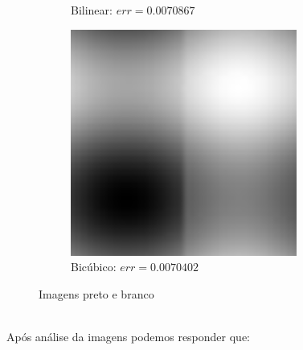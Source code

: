 \documentclass[12pt, a4paper]{article}
\begin{document}
\begin{figure}[h]
\begin{subfigure}{.3\textwidth}
            \caption{Bilinear: $err = 0.0070867$}
        \end{subfigure}
        \begin{subfigure}{.3\textwidth}
            \includegraphics[width=.95\textwidth]{../trdFunBWBC.png}
            \caption{Bicúbico: $err = 0.0070402$}
        \end{subfigure}
        \caption{Imagens preto e branco}
    \end{figure}
    \vspace{2cm}\\
    Após análise da imagens podemos responder que:
\end{document}
